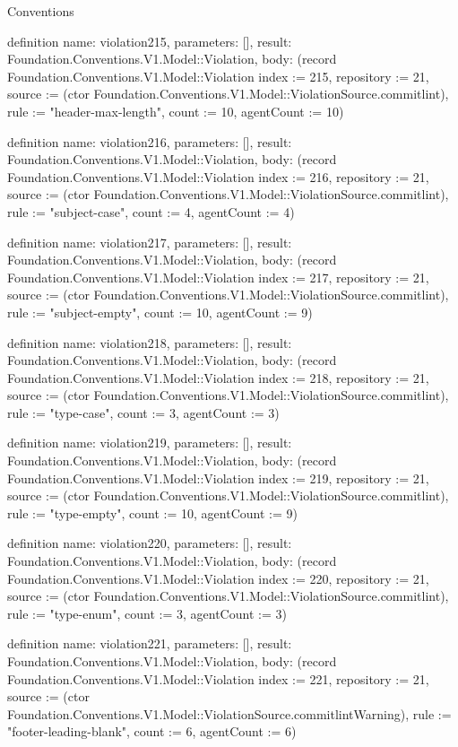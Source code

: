 \begin{lexlean}{Conventions}
\begin{semanticmodule}
definition{
  name: violation215,
  parameters: [],
  result: Foundation.Conventions.V1.Model::Violation,
  body: (record Foundation.Conventions.V1.Model::Violation {index := 215, repository := 21, source := (ctor Foundation.Conventions.V1.Model::ViolationSource.commitlint), rule := "header-max-length", count := 10, agentCount := 10})
}

definition{
  name: violation216,
  parameters: [],
  result: Foundation.Conventions.V1.Model::Violation,
  body: (record Foundation.Conventions.V1.Model::Violation {index := 216, repository := 21, source := (ctor Foundation.Conventions.V1.Model::ViolationSource.commitlint), rule := "subject-case", count := 4, agentCount := 4})
}

definition{
  name: violation217,
  parameters: [],
  result: Foundation.Conventions.V1.Model::Violation,
  body: (record Foundation.Conventions.V1.Model::Violation {index := 217, repository := 21, source := (ctor Foundation.Conventions.V1.Model::ViolationSource.commitlint), rule := "subject-empty", count := 10, agentCount := 9})
}

definition{
  name: violation218,
  parameters: [],
  result: Foundation.Conventions.V1.Model::Violation,
  body: (record Foundation.Conventions.V1.Model::Violation {index := 218, repository := 21, source := (ctor Foundation.Conventions.V1.Model::ViolationSource.commitlint), rule := "type-case", count := 3, agentCount := 3})
}

definition{
  name: violation219,
  parameters: [],
  result: Foundation.Conventions.V1.Model::Violation,
  body: (record Foundation.Conventions.V1.Model::Violation {index := 219, repository := 21, source := (ctor Foundation.Conventions.V1.Model::ViolationSource.commitlint), rule := "type-empty", count := 10, agentCount := 9})
}

definition{
  name: violation220,
  parameters: [],
  result: Foundation.Conventions.V1.Model::Violation,
  body: (record Foundation.Conventions.V1.Model::Violation {index := 220, repository := 21, source := (ctor Foundation.Conventions.V1.Model::ViolationSource.commitlint), rule := "type-enum", count := 3, agentCount := 3})
}

definition{
  name: violation221,
  parameters: [],
  result: Foundation.Conventions.V1.Model::Violation,
  body: (record Foundation.Conventions.V1.Model::Violation {index := 221, repository := 21, source := (ctor Foundation.Conventions.V1.Model::ViolationSource.commitlintWarning), rule := "footer-leading-blank", count := 6, agentCount := 6})
}


\end{semanticmodule}
\end{lexlean}

